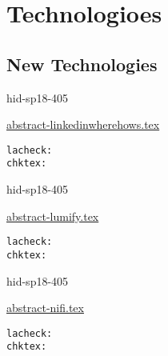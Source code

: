 \part{Technologioes}
\chapter{New Technologies}


\begin{IU}

hid-sp18-405

\href{https://github.com/cloudmesh-community/hid-sp18-405/blob/master//technology/abstract-linkedinwherehows.tex}{abstract-linkedinwherehows.tex}

\begin{tiny}
\begin{verbatim}
lacheck: 
chktex: 
\end{verbatim}
\end{tiny}
\end{IU}



\begin{IU}

hid-sp18-405

\href{https://github.com/cloudmesh-community/hid-sp18-405/blob/master//technology/abstract-lumify.tex}{abstract-lumify.tex}

\begin{tiny}
\begin{verbatim}
lacheck: 
chktex: 
\end{verbatim}
\end{tiny}
\end{IU}



\begin{IU}

hid-sp18-405

\href{https://github.com/cloudmesh-community/hid-sp18-405/blob/master//technology/abstract-nifi.tex}{abstract-nifi.tex}

\begin{tiny}
\begin{verbatim}
lacheck: 
chktex: 
\end{verbatim}
\end{tiny}
\end{IU}



